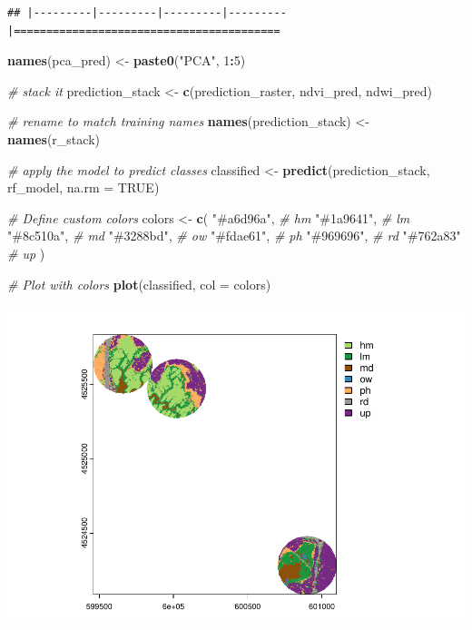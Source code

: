 \documentclass[
]{article}
\newenvironment{Shaded}{\begin{snugshade}}{\end{snugshade}}
\newcommand{\AttributeTok}[1]{\textcolor[rgb]{0.13,0.29,0.53}{#1}}
\newcommand{\CommentTok}[1]{\textcolor[rgb]{0.56,0.35,0.01}{\textit{#1}}}
\newcommand{\ConstantTok}[1]{\textcolor[rgb]{0.56,0.35,0.01}{#1}}
\newcommand{\DecValTok}[1]{\textcolor[rgb]{0.00,0.00,0.81}{#1}}
\newcommand{\FunctionTok}[1]{\textcolor[rgb]{0.13,0.29,0.53}{\textbf{#1}}}
\newcommand{\NormalTok}[1]{#1}
\newcommand{\OtherTok}[1]{\textcolor[rgb]{0.56,0.35,0.01}{#1}}
\newcommand{\SpecialCharTok}[1]{\textcolor[rgb]{0.81,0.36,0.00}{\textbf{#1}}}
\newcommand{\StringTok}[1]{\textcolor[rgb]{0.31,0.60,0.02}{#1}}
\begin{document}
\begin{verbatim}
## |---------|---------|---------|---------|=========================================                                          
\end{verbatim}

\begin{Shaded}
\begin{Highlighting}[]
\FunctionTok{names}\NormalTok{(pca\_pred) }\OtherTok{\textless{}{-}} \FunctionTok{paste0}\NormalTok{(}\StringTok{"PCA"}\NormalTok{, }\DecValTok{1}\SpecialCharTok{:}\DecValTok{5}\NormalTok{)}

\CommentTok{\# stack it}
\NormalTok{prediction\_stack }\OtherTok{\textless{}{-}} \FunctionTok{c}\NormalTok{(prediction\_raster, ndvi\_pred, ndwi\_pred)}

\CommentTok{\# rename to match training names}
\FunctionTok{names}\NormalTok{(prediction\_stack) }\OtherTok{\textless{}{-}} \FunctionTok{names}\NormalTok{(r\_stack)}

\CommentTok{\# apply the model to predict classes}
\NormalTok{classified }\OtherTok{\textless{}{-}} \FunctionTok{predict}\NormalTok{(prediction\_stack, rf\_model, }\AttributeTok{na.rm =} \ConstantTok{TRUE}\NormalTok{)}

\CommentTok{\# Define custom colors}
\NormalTok{colors }\OtherTok{\textless{}{-}} \FunctionTok{c}\NormalTok{(}
  \StringTok{"\#a6d96a"}\NormalTok{,  }\CommentTok{\# hm  }
  \StringTok{"\#1a9641"}\NormalTok{,  }\CommentTok{\# lm  }
  \StringTok{"\#8c510a"}\NormalTok{,  }\CommentTok{\# md  }
  \StringTok{"\#3288bd"}\NormalTok{,  }\CommentTok{\# ow  }
  \StringTok{"\#fdae61"}\NormalTok{,  }\CommentTok{\# ph  }
  \StringTok{"\#969696"}\NormalTok{,  }\CommentTok{\# rd  }
  \StringTok{"\#762a83"}   \CommentTok{\# up  }
\NormalTok{)}



\CommentTok{\# Plot with colors}
\FunctionTok{plot}\NormalTok{(classified, }\AttributeTok{col =}\NormalTok{ colors)}
\end{Highlighting}
\end{Shaded}

\includegraphics{veg_model_new_class_files/figure-latex/unnamed-chunk-8-1.pdf}
\end{document}
